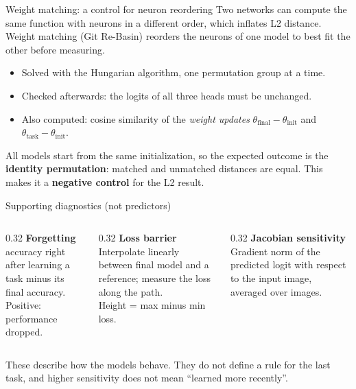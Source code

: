 \documentclass[aspectratio=169,11pt]{beamer}
\newcommand{\hl}[1]{{\color{accent}\bfseries #1}}
\begin{document}
\begin{frame}{Weight matching: a control for neuron reordering}
  Two networks can compute the same function with neurons in a different order, which inflates L2 distance. Weight matching (Git Re-Basin) reorders the neurons of one model to best fit the other before measuring.

  \medskip
  \begin{itemize}
    \item Solved with the Hungarian algorithm, one permutation group at a time.
    \item Checked afterwards: the logits of all three heads must be unchanged.
    \item Also computed: cosine similarity of the \emph{weight updates} $\theta_{\text{final}}-\theta_{\text{init}}$ and $\theta_{\text{task}}-\theta_{\text{init}}$.
  \end{itemize}

  \medskip
  All models start from the same initialization, so the expected outcome is the \textbf{identity permutation}: matched and unmatched distances are equal. This makes it a \hl{negative control} for the L2 result.
\end{frame}

\begin{frame}{Supporting diagnostics (not predictors)}
  \begin{columns}[T]
    \begin{column}{0.32\textwidth}
      \textbf{Forgetting}\\[2pt]
      accuracy right after learning a task minus its final accuracy.\\[2pt]
      Positive: performance dropped.
    \end{column}
    \begin{column}{0.32\textwidth}
      \textbf{Loss barrier}\\[2pt]
      Interpolate linearly between final model and a reference; measure the loss along the path.\\[2pt]
      Height = max minus min loss.
    \end{column}
    \begin{column}{0.32\textwidth}
      \textbf{Jacobian sensitivity}\\[2pt]
      Gradient norm of the predicted logit with respect to the input image, averaged over images.
    \end{column}
  \end{columns}

  \vspace{6mm}
  These describe how the models behave. They do not define a rule for the last task, and higher sensitivity does not mean ``learned more recently''.
\end{frame}
\end{document}

